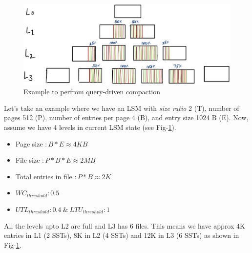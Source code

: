 \begin{figure}
    \includegraphics[scale=0.2]{Figures/first-state-lsm.jpg}
    \caption{Example to perfrom query-driven compaction}\label{fig:first-state-lsm}
\end{figure}


Let's take an example where we have an LSM with \textit{size ratio} 2 (T), number of pages 512 (P), 
number of entries per page 4 (B), and entry size 1024 B (E). Now, assume we have 4 levels in current LSM state 
(see Fig-\ref{fig:first-state-lsm}).

\begin{itemize}
    \item Page size $\colon B * E \approx 4 KB$
    \item File size $\colon P * B * E \approx 2 MB$
    \item Total entries in file $\colon P * B \approx 2 K$
    \item $WC_{threshold} \colon 0.5$
    \item $UTL_{threshold} \colon 0.4\ \&\ LTU_{threshold} \colon 1$ 
\end{itemize}

All the levels upto L2 are full and L3 has 6 files. This means we have approx 4K entries in L1 (2 SSTs), 8K in 
L2 (4 SSTs) and 12K in L3 (6 SSTs) as shown in Fig-\ref{fig:first-state-lsm}.

\begin{table}
    \caption{Decision making data for example shown in Fig-\ref{fig:first-state-lsm}}
    \label{table:ex-decision-making-meta-data}
\end{table}


